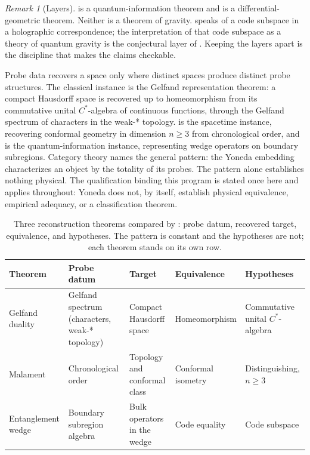 \documentclass[11pt,letterpaper]{article}
\theoremstyle{definition}
\theoremstyle{remark}
\newtheorem{remark}[theorem]{Remark}
\begin{document}
\begin{remark}[Layers]\label{rem:layers}
 is a quantum-information theorem and  is a differential-geometric theorem. Neither is a theorem of gravity.  speaks of a code subspace in a holographic correspondence; the interpretation of that code subspace as a theory of quantum gravity is the conjectural layer of . Keeping the layers apart is the discipline that makes the claims checkable.
\end{remark}

Probe data recovers a space only where distinct spaces produce distinct probe structures. The classical instance is the Gelfand representation theorem: a compact Hausdorff space is recovered up to homeomorphism from its commutative unital $C^*$-algebra of continuous functions, through the Gelfand spectrum of characters in the weak-* topology.  is the spacetime instance, recovering conformal geometry in dimension $n \ge 3$ from chronological order, and  is the quantum-information instance, representing wedge operators on boundary subregions. Category theory names the general pattern: the Yoneda embedding characterizes an object by the totality of its probes. The pattern alone establishes nothing physical. The qualification binding this program is stated once here and applies throughout: Yoneda does not, by itself, establish physical equivalence, empirical adequacy, or a classification theorem.

\begin{table}[t]
\centering
\caption{Three reconstruction theorems compared by : probe datum, recovered target, equivalence, and hypotheses. The pattern is constant and the hypotheses are not; each theorem stands on its own row.}
\label{tab:reconstruction}
\footnotesize
\begin{tabularx}{\textwidth}{L{0.13\textwidth}L{0.20\textwidth}L{0.20\textwidth}L{0.15\textwidth}X}
\toprule
Theorem & Probe datum & Target & Equivalence & Hypotheses \\
\midrule
Gelfand duality & Gelfand spectrum (characters, weak-* topology) & Compact Hausdorff space & Homeomorphism & Commutative unital $C^*$-algebra \\
Malament & Chronological order & Topology and conformal class & Conformal isometry & Distinguishing, $n \ge 3$ \\
Entanglement wedge & Boundary subregion algebra & Bulk operators in the wedge & Code equality & Code subspace \\
\bottomrule
\end{tabularx}
\end{table}
\end{document}
